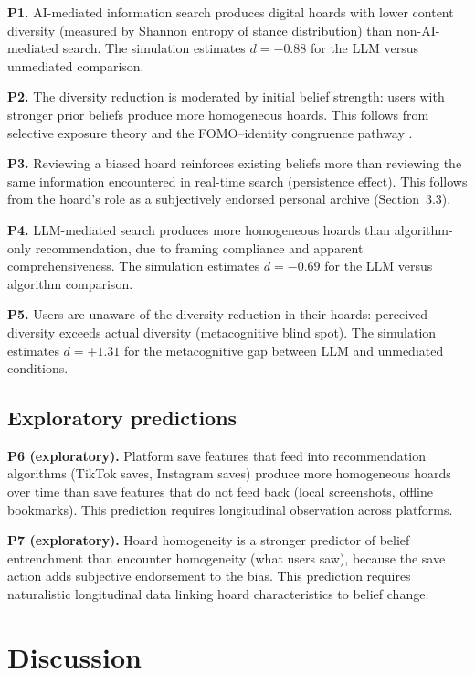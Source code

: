 \documentclass[12pt,a4paper]{article}
\begin{document}
\textbf{P1.} AI-mediated information search produces digital hoards with lower content diversity (measured by Shannon entropy of stance distribution) than non-AI-mediated search.
The simulation estimates $d = -0.88$ for the LLM versus unmediated comparison.

\textbf{P2.} The diversity reduction is moderated by initial belief strength: users with stronger prior beliefs produce more homogeneous hoards.
This follows from selective exposure theory \citep{Klapper1960} and the FOMO--identity congruence pathway \citep{Bai2025}.

\textbf{P3.} Reviewing a biased hoard reinforces existing beliefs more than reviewing the same information encountered in real-time search (persistence effect).
This follows from the hoard's role as a subjectively endorsed personal archive (Section~3.3).

\textbf{P4.} LLM-mediated search produces more homogeneous hoards than algorithm-only recommendation, due to framing compliance and apparent comprehensiveness.
The simulation estimates $d = -0.69$ for the LLM versus algorithm comparison.

\textbf{P5.} Users are unaware of the diversity reduction in their hoards: perceived diversity exceeds actual diversity (metacognitive blind spot).
The simulation estimates $d = +1.31$ for the metacognitive gap between LLM and unmediated conditions.


\subsection{Exploratory predictions}

\textbf{P6 (exploratory).} Platform save features that feed into recommendation algorithms (TikTok saves, Instagram saves) produce more homogeneous hoards over time than save features that do not feed back (local screenshots, offline bookmarks).
This prediction requires longitudinal observation across platforms.

\textbf{P7 (exploratory).} Hoard homogeneity is a stronger predictor of belief entrenchment than encounter homogeneity (what users saw), because the save action adds subjective endorsement to the bias.
This prediction requires naturalistic longitudinal data linking hoard characteristics to belief change.


\section{Discussion}
\end{document}
